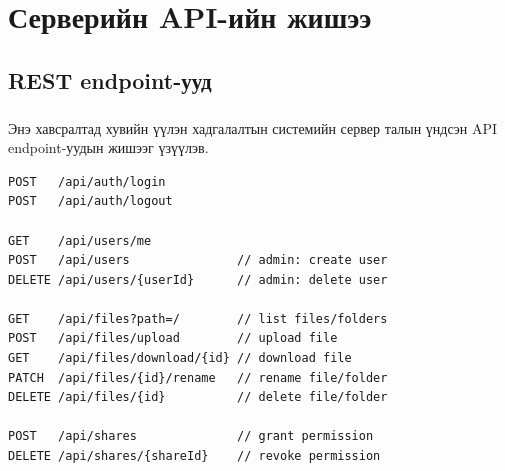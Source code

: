 
\chapter{Серверийн API-ийн жишээ}
\label{AppendixA}

\section{REST endpoint-ууд}
\paragraph{}
Энэ хавсралтад хувийн үүлэн хадгалалтын системийн сервер талын үндсэн API endpoint-уудын жишээг үзүүлэв.

\begin{lstlisting}
POST   /api/auth/login
POST   /api/auth/logout

GET    /api/users/me
POST   /api/users               // admin: create user
DELETE /api/users/{userId}      // admin: delete user

GET    /api/files?path=/        // list files/folders
POST   /api/files/upload        // upload file
GET    /api/files/download/{id} // download file
PATCH  /api/files/{id}/rename   // rename file/folder
DELETE /api/files/{id}          // delete file/folder

POST   /api/shares              // grant permission
DELETE /api/shares/{shareId}    // revoke permission
\end{lstlisting}
